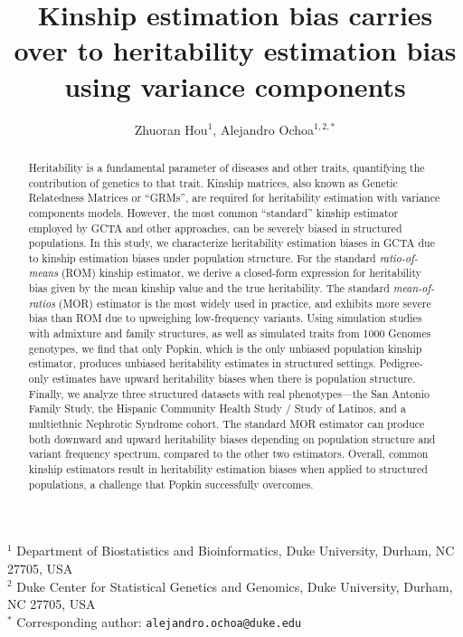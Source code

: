 \documentclass[11pt]{article}
\title{\Large \textbf{Kinship estimation bias carries over to heritability estimation bias using variance components}}
\author{Zhuoran Hou$^1$, Alejandro Ochoa$^{1,2,*}$}
\date{}
\begin{document}
\maketitle

\noindent
$^1$ Department of Biostatistics and Bioinformatics, Duke University, Durham, NC 27705, USA \\
$^2$ Duke Center for Statistical Genetics and Genomics, Duke University, Durham, NC 27705, USA \\
$^*$ Corresponding author: \texttt{alejandro.ochoa@duke.edu}

\begin{abstract}
Heritability is a fundamental parameter of diseases and other traits, quantifying the contribution of genetics to that trait. Kinship matrices, also known as Genetic Relatedness Matrices or “GRMs”, are required for heritability estimation with variance components models. However, the most common “standard” kinship estimator employed by GCTA and other approaches, can be severely biased in structured populations. 
In this study, we characterize heritability estimation biases in GCTA due to kinship estimation biases under population structure.
For the standard \textit{ratio-of-means} (ROM) kinship estimator, we derive a closed-form expression for heritability bias given by the mean kinship value and the true heritability.
The standard \textit{mean-of-ratios} (MOR) estimator is the most widely used in practice, and exhibits more severe bias than ROM due to upweighing low-frequency variants. Using simulation studies with admixture and family structures, as well as simulated traits from 1000 Genomes genotypes, we find that only Popkin, which is the only unbiased population kinship estimator, produces unbiased heritability estimates in structured settings.
Pedigree-only estimates have upward heritability biases when there is population structure.  Finally, we analyze three structured datasets with real phenotypes—the San Antonio Family Study, the Hispanic Community Health Study / Study of Latinos, and a multiethnic Nephrotic Syndrome cohort. The standard MOR estimator can produce both downward and upward heritability biases depending on population structure and variant frequency spectrum, compared to the other two estimators. Overall, common kinship estimators result in heritability estimation biases when applied to structured populations, a challenge that Popkin successfully overcomes.
\end{abstract}

\end{document}
